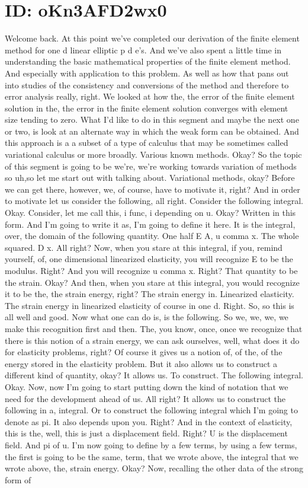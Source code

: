 \documentclass[10pt]{article}
\begin{document}
{\section*{ID: oKn3AFD2wx0}
Welcome back. At this point we've completed our derivation of the finite element method for one d linear elliptic p d e's. And we've also spent a little time in understanding the basic mathematical properties of the finite element method. And especially with application to this problem. As well as how that pans out into studies of the consistency and conversions of the method and therefore to error analysis really, right. We looked at how the, the error of the finite element solution in the, the error in the finite element solution converges with element size tending to zero.  What I'd like to do in this segment and maybe the next one or two, is look at an alternate way in which the weak form can be obtained. And this approach is a a subset of a type of calculus that may be sometimes called variational calculus or more broadly. Various known methods. Okay? So the topic of this segment is going to be we're, we're working towards variation of methods so uh,so let me start out with talking about. Variational methods, okay? Before we can get there, however, we, of course, have to motivate it, right? And in order to motivate let us consider the following, all right. Consider the following integral. Okay. Consider, let me call this, i func, i depending on u. Okay? Written in this form. And I'm going to write it as, I'm going to define it here. It is the integral, over, the domain of the following quantity. One half E A, u comma x. The whole squared. D x. All right? Now, when you stare at this integral, if you, remind yourself, of, one dimensional linearized elasticity, you will recognize E to be the modulus. Right? And you will recognize u comma x. Right? That quantity to be the strain. Okay? And then, when you stare at this integral, you would recognize it to be the, the strain energy, right? The strain energy in. Linearized elasticity. The strain energy in linearized elasticity of course in one d. Right. So, so this is all well and good. Now what one can do is, is the following. So we, we, we, we make this recognition first and then. The, you know, once, once we recognize that there is this notion of a strain energy, we can ask ourselves, well, what does it do for elasticity problems, right? Of course it gives us a notion of, of the, of the energy stored in the elasticity problem. But it also allows us to construct a different kind of quantity, okay? It allows us. To construct. The following integral. Okay. Now, now I'm going to start putting down the kind of notation that we need for the development ahead of us. All right? It allows us to construct the following in a, integral. Or to construct the following integral which I'm going to denote as pi. It also depends upon you. Right? And in the context of elasticity, this is the, well, this is just a displacement field. Right? U is the displacement field. And pi of u. I'm now going to define by a few terms, by using a few terms, the first is going to be the same, term, that we wrote above, the integral that we wrote above, the, strain energy. Okay? Now, recalling the other data of the strong form of }
\end{document}
